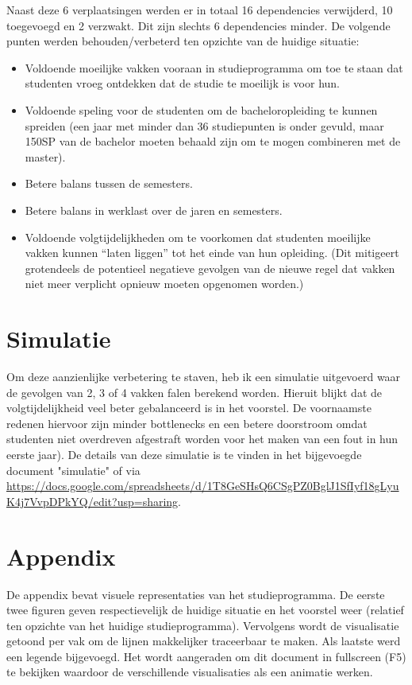 \documentclass[a4paper]{article}
\begin{document}
    Naast deze 6 verplaatsingen werden er in totaal 16 dependencies verwijderd, 10 toegevoegd en 2 verzwakt. Dit zijn slechts 6 dependencies minder. De volgende punten werden behouden/verbeterd ten opzichte van de huidige situatie:
    \begin{itemize}
        \item Voldoende moeilijke vakken vooraan in studieprogramma om toe te staan dat studenten vroeg ontdekken dat de studie te moeilijk is voor hun.
        \item Voldoende speling voor de studenten om de bacheloropleiding te kunnen spreiden (een jaar met minder dan 36 studiepunten is onder gevuld, maar 150SP van de bachelor moeten behaald zijn om te mogen combineren met de master).
        \item Betere balans tussen de semesters.
        \item Betere balans in werklast over de jaren en semesters.
        \item Voldoende volgtijdelijkheden om te voorkomen dat studenten moeilijke vakken kunnen “laten liggen” tot het einde van hun opleiding. (Dit mitigeert grotendeels de potentieel negatieve gevolgen van de nieuwe regel dat vakken niet meer verplicht opnieuw moeten opgenomen worden.)
    \end{itemize}

    \section{Simulatie}
    \label{sec:simulatie}

    Om deze aanzienlijke verbetering te staven, heb ik een simulatie uitgevoerd waar de gevolgen van 2, 3 of 4 vakken falen berekend worden. Hieruit blijkt dat de volgtijdelijkheid veel beter gebalanceerd is in het voorstel. De voornaamste redenen hiervoor zijn minder bottlenecks en een betere doorstroom omdat studenten niet overdreven afgestraft worden voor het maken van een fout in hun eerste jaar). De details van deze simulatie is te vinden in het bijgevoegde document "simulatie" of via \url{https://docs.google.com/spreadsheets/d/1T8GeSHsQ6CSgPZ0BglJ1SfIyf18gLyuK4j7VvpDPkYQ/edit?usp=sharing}.

    \appendix
    \section{Appendix}
    \label{sec:appenix}

    De appendix bevat visuele representaties van het studieprogramma. De eerste twee figuren geven respectievelijk de huidige situatie en het voorstel weer (relatief ten opzichte van het huidige studieprogramma). Vervolgens wordt de visualisatie getoond per vak om de lijnen makkelijker traceerbaar te maken. Als laatste werd een legende bijgevoegd. Het wordt aangeraden om dit document in fullscreen (F5) te bekijken waardoor de verschillende visualisaties als een animatie werken.
\end{document}
